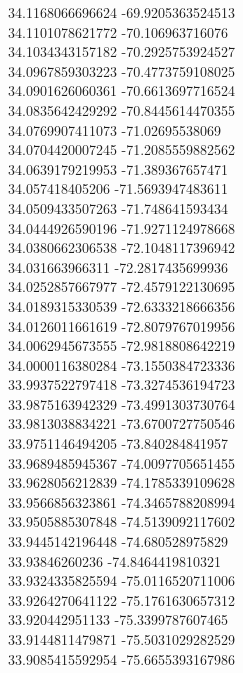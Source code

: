 {34.1168066696624	-69.9205363524513\\
34.1101078621772	-70.106963716076\\
34.1034343157182	-70.2925753924527\\
34.0967859303223	-70.4773759108025\\
34.0901626060361	-70.6613697716524\\
34.0835642429292	-70.8445614470355\\
34.0769907411073	-71.02695538069\\
34.0704420007245	-71.2085559882562\\
34.0639179219953	-71.389367657471\\
34.057418405206	-71.5693947483611\\
34.0509433507263	-71.748641593434\\
34.0444926590196	-71.9271124978668\\
34.0380662306538	-72.1048117396942\\
34.031663966311	-72.2817435699936\\
34.0252857667977	-72.4579122130695\\
34.0189315330539	-72.6333218666356\\
34.0126011661619	-72.8079767019956\\
34.0062945673555	-72.9818808642219\\
34.0000116380284	-73.1550384723336\\
33.9937522797418	-73.3274536194723\\
33.9875163942329	-73.4991303730764\\
33.9813038834221	-73.6700727750546\\
33.9751146494205	-73.840284841957\\
33.9689485945367	-74.0097705651455\\
33.9628056212839	-74.1785339109628\\
33.9566856323861	-74.3465788208994\\
33.9505885307848	-74.5139092117602\\
33.9445142196448	-74.680528975829\\
33.93846260236	-74.8464419810321\\
33.9324335825594	-75.0116520711006\\
33.9264270641122	-75.1761630657312\\
33.920442951133	-75.3399787607465\\
33.9144811479871	-75.5031029282529\\
33.9085415592954	-75.6655393167986\\
}
